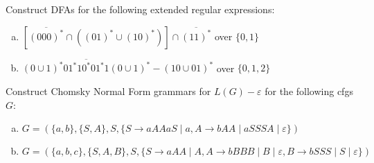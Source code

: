 \begin{exercise}{2}
    Construct DFAs for the following extended regular expressions:
    \begin{enumerate}[(a)]
        \item \(\left[\overline{{(000)}^*}\cap\left({(01)}^*\cup{(10)}^*\right)\right]\cap\overline{{(11)}^*}\) over \( \{0,1\} \)
        \item \(\overline{{(0\cup1)}^*01^*10^*01^*1{(0\cup1)}^*} - {(10\cup01)}^*\) over \( \{0, 1, 2\} \)
    \end{enumerate}
\end{exercise}

\begin{exercise}{3}
    Construct Chomsky Normal Form grammars for \(L(G)-\varepsilon \) for the following cfgs \(G\):
    \begin{enumerate}[(a)]
        \item \(G=\left(\{a, b\}, \{S, A\}, S, \{S\to aAAaS\mid a, A\to bAA\mid aSSSA\mid \varepsilon \}\right)\)
        \item \(G=\left(\{a, b, c\}, \{S, A, B\}, S, \{S\to aAA\mid A, A\to bBBB\mid B\mid \varepsilon, B\to bSSS\mid S\mid \varepsilon \}\right)\)
    \end{enumerate}
\end{exercise}

